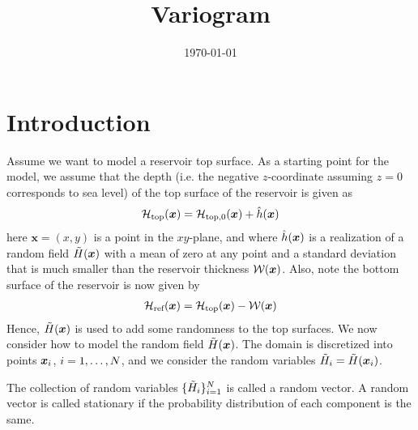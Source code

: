 \documentclass[11pt,a4paper]{amsart}
\begin{document}
\title{Variogram}
\date{\today}
\maketitle
\section{Introduction}
\label{sec:introduction}
Assume we want to model a reservoir top surface. As a starting point for the
model, we assume that the depth (i.e. the negative $z$-coordinate assuming
$z=0$ corresponds to sea level) of the top surface of the reservoir is
given as
\begin{align}
  \label{eq:17}
  \mathcal{H}_{\text{top}}(\boldsymbol{x}) = \mathcal{H}_{\text{top,0}}(\boldsymbol{x})
  + \hat{h}(\boldsymbol{x})
\end{align}
here $\boldsymbol{x} = (x, y)$ is a point in the $xy$-plane, and
where $\hat{h}(\boldsymbol{x})$ is a realization of a random field
$\tilde{H}(\boldsymbol{x})$ with a mean of zero at any point and a
standard deviation that is much smaller than the reservoir thickness
$\mathcal{W}(\boldsymbol{x})$.
Also, note the bottom surface of the reservoir is now given by
\begin{align}
  \label{eq:20}  
  \mathcal{H}_{\text{ref}}(\boldsymbol{x}) = \mathcal{H}_{\text{top}}(\boldsymbol{x})
  - \mathcal{W}(\boldsymbol{x})
\end{align}
Hence, $\tilde{H}(\boldsymbol{x})$
is used to add some randomness to the top surfaces.
We now consider how to model the random field $\tilde{H}(\boldsymbol{x})$.
The domain is discretized into points $\boldsymbol{x}_i$, $i=1, \ldots,
N$, and 
we consider the random variables $\tilde{H}_i = \tilde{H}(\boldsymbol{x}_i)$.

The collection of random variables $\{ \tilde{H}_i
\}_{i=1}^{N}$ is called a 
random vector. 
A random vector is called stationary if the probability  
distribution of each component is the same.
\end{document}
